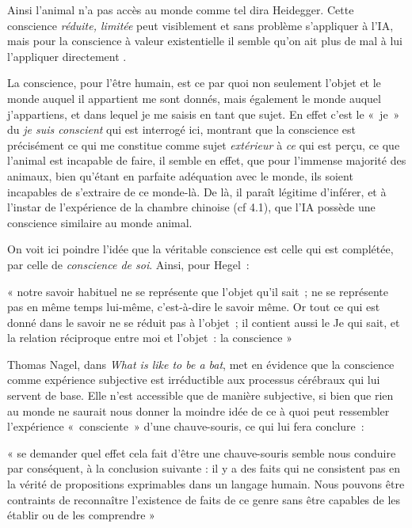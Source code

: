 \documentclass[a4paper, titlepage, 12pt]{article}
\newenvironment{longquote}%
{\vspace{-9pt}\begin{center}\begin{minipage}{120mm}\singlespacing\footnotesize «}%
{»\end{minipage}\end{center}\vspace{9pt}}
\begin{document}
	Ainsi l’animal n’a pas accès au monde comme tel dira Heidegger. Cette conscience \textit{réduite, limitée} peut visiblement et sans problème s’appliquer à l’IA, mais pour la conscience à valeur existentielle il semble qu’on ait plus de mal à lui l’appliquer directement \cite{heideggerEtreTemps1986}.

	La conscience, pour l’être humain, est ce par quoi non seulement l’objet et le monde auquel il appartient me sont donnés, mais également le monde auquel j'appartiens, et dans lequel je me saisis en tant que sujet. En effet c’est le «~je~» du \textit{je suis conscient} qui est interrogé ici, montrant que la conscience est précisément ce qui me constitue comme sujet \textit{extérieur} à \textit{ce} qui est perçu, ce que l’animal est incapable de faire, il semble en effet, que pour l’immense majorité des animaux, bien qu’étant en parfaite adéquation avec le monde, ils soient incapables de s’extraire de ce monde-là. De là, il paraît légitime d’inférer, et à l’instar de l’expérience de la chambre chinoise (cf 4.1), que l’IA possède une conscience similaire au monde animal.

	On voit ici poindre l’idée que la véritable conscience est celle qui est complétée, par celle de \textit{conscience de soi}. Ainsi, pour Hegel~: \cite{hegelPropedeutiquePhilosophiqueTraduit1963}
	\begin{longquote}
		notre savoir habituel ne se représente que l’objet qu’il sait~; ne se représente pas en même temps lui-même, c’est-à-dire le savoir même. Or tout ce qui est donné dans le savoir ne se réduit pas à l’objet~; il contient aussi le Je qui sait, et la relation réciproque entre moi et l’objet~: la conscience
	\end{longquote}

	Thomas Nagel, dans \textit{What is like to be a bat}, met en évidence que la conscience comme expérience subjective est irréductible aux processus cérébraux qui lui servent de base. Elle n’est accessible que de manière subjective, si bien que rien au monde ne saurait nous donner la moindre idée de ce à quoi peut ressembler l’expérience «~consciente~» d’une chauve-souris, ce qui lui fera conclure~: \cite{nagelWhatItBe2012}
	\begin{longquote}
		se demander quel effet cela fait d’être une chauve-souris semble nous conduire par conséquent, à la conclusion suivante : il y a des faits qui ne consistent pas en la vérité de propositions exprimables dans un langage humain. Nous pouvons être contraints de reconnaître l’existence de faits de ce genre sans être capables de les établir ou de les comprendre
	\end{longquote}
\end{document}
